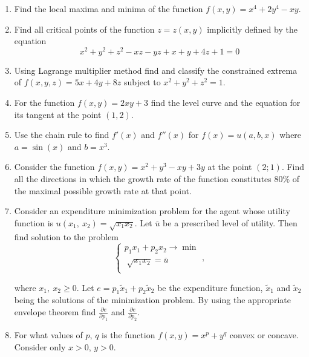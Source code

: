 \begin{enumerate}
  \item  Find the local maxima and minima of the function $f(x,y)=x^4+2y^4-xy$.
  \item
Find all critical points of the function $z=z(x,y)$ implicitly defined by the equation
\begin{equation}
x^2+y^2+z^2-xz-yz+x+y+4z+1=0
\end{equation}
\item
Using Lagrange multiplier method find and classify the constrained extrema of $f(x, y, z) =  5x +4y + 8z$ subject to $x^2 + y^2 + z^2 = 1$.
\item
  For the function $f(x,y)=2xy+3$ find the level curve and the equation for its tangent at the point $(1,2)$.
\item
Use the chain rule to find $f'(x)$ and $f''(x)$ for $f(x)=u(a,b,x)$ where $a=\sin(x)$ and $b=x^3$.
\item
Consider the function $f(x,y)=x^2+y^3-xy+3y$ at the point $(2;1)$. Find all the directions in which the  growth rate of the function constitutes $80\%$ of the maximal possible growth rate at that point.
\item Consider an expenditure minimization problem for the agent whose utility function is $u({{x}_{1}},\ {{x}_{2}})=\sqrt{{{x}_{1}}{{x}_{2}}}$. Let $\bar{u}$ be a prescribed level of utility. Then find solution to the problem
\[
  \begin{cases}
    {{p}_{1}}{{x}_{1}}+{{p}_{2}}{{x}_{2}}\to \min   \\
    \sqrt[{}]{{{x}_{1}}{{x}_{2}}}=\bar{u}  \\
  \end{cases},
\]

where ${x}_{1},\ {{x}_{2}}\ge 0$. Let $e={{p}_{1}}{{\tilde{x}}_{1}}+{{p}_{2}}{{\tilde{x}}_{2}}$ be the expenditure function, ${{\tilde{x}}_{1}}$ and ${{\tilde{x}}_{2}}$ being the solutions of the minimization problem. By using the appropriate envelope theorem find $\frac{\partial e}{\partial {{p}_{1}}}$ and $\frac{\partial e}{\partial {{p}_{2}}}$.
\item
 For what values of $p$, $q$ is the function $f(x,y)={{x}^{p}}+{{y}^{q}}$ convex or concave. Consider only $x>0$, $y>0$.
\end{enumerate}

